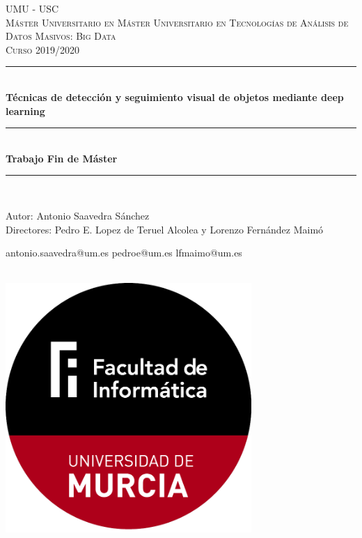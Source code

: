 \begin{titlepage}

    \newcommand{\HRule}{\rule{\linewidth}{0.5mm}} %

    \center %

    \textsc{\LARGE UMU - USC}\\[0.8cm]
    \textsc{\Large Máster Universitario en Máster Universitario en Tecnologías de Análisis de Datos Masivos: Big Data}\\[0.5cm]
    \textsc{\large Curso 2019/2020}\\[0.4cm]

    \HRule \\[0.6cm]
    { \huge \bfseries Técnicas de detección y seguimiento visual de objetos mediante deep learning}\\[0.3cm]
    \HRule \\[0.5cm]
    { \Large \bfseries Trabajo Fin de Máster}\\[0.3cm]
    \HRule \\[0.2cm]



    \begin{minipage}{0.5\textwidth}
        \begin{flushleft}
            Autor: Antonio Saavedra Sánchez \\
            Directores: Pedro E. Lopez de Teruel Alcolea y Lorenzo Fernández Maimó
        \end{flushleft}
    \end{minipage}
    \begin{minipage}{0.3\textwidth}
        \begin{flushright}
            antonio.saavedra@um.es
            pedroe@um.es
            lfmaimo@um.es
        \end{flushright}
    \end{minipage}\\[1cm]

    \centering
    \includegraphics[width=0.7\textwidth]{./images/logo}


\end{titlepage}

